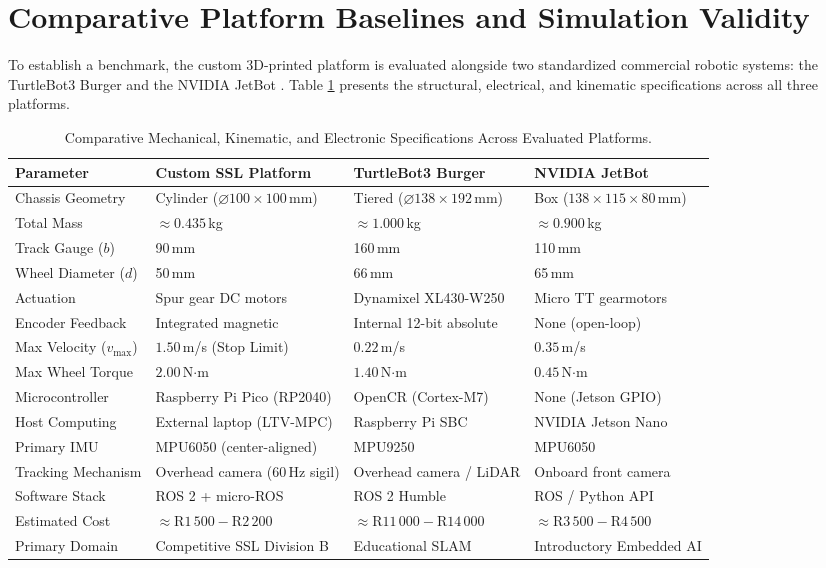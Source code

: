\documentclass[a4paper,twoside,12pt]{report}
\begin{document}
\section{Comparative Platform Baselines and Simulation Validity}

To establish a benchmark, the custom 3D-printed platform is evaluated alongside two standardized commercial robotic systems: the TurtleBot3 Burger \citep{turtlebot3_emanual} and the NVIDIA JetBot \citep{jetbot_org}. Table \ref{tab:platform_comparison} presents the structural, electrical, and kinematic specifications across all three platforms.

\begin{table}[H]
\centering
\small
\caption{Comparative Mechanical, Kinematic, and Electronic Specifications Across Evaluated Platforms.}
\label{tab:platform_comparison}
\begin{tabularx}{\textwidth}{p{3.4cm}XXX}
\toprule
\textbf{Parameter} & \textbf{Custom SSL Platform} & \textbf{TurtleBot3 Burger} & \textbf{NVIDIA JetBot} \\
\midrule
Chassis Geometry & Cylinder ($\varnothing 100 \times 100$\,mm) & Tiered ($\varnothing 138 \times 192$\,mm) & Box ($138 \times 115 \times 80$\,mm) \\
Total Mass & $\approx 0.435$\,kg & $\approx 1.000$\,kg & $\approx 0.900$\,kg \\
Track Gauge ($b$) & 90\,mm & 160\,mm & 110\,mm \\
Wheel Diameter ($d$) & 50\,mm & 66\,mm & 65\,mm \\
Actuation & Spur gear DC motors & Dynamixel XL430-W250 & Micro TT gearmotors \\
Encoder Feedback & Integrated magnetic & Internal 12-bit absolute & None (open-loop) \\
Max Velocity ($v_{\text{max}}$) & $1.50$\,m/s (Stop Limit) & $0.22$\,m/s & $0.35$\,m/s \\
Max Wheel Torque & $2.00$\,N$\cdot$m & $1.40$\,N$\cdot$m & $0.45$\,N$\cdot$m \\
Microcontroller & Raspberry Pi Pico (RP2040) & OpenCR (Cortex-M7) & None (Jetson GPIO) \\
Host Computing & External laptop (LTV-MPC) & Raspberry Pi SBC & NVIDIA Jetson Nano \\
Primary IMU & MPU6050 (center-aligned) & MPU9250 & MPU6050 \\
Tracking Mechanism & Overhead camera (60\,Hz sigil) & Overhead camera / LiDAR & Onboard front camera \\
Software Stack & ROS 2 + micro-ROS & ROS 2 Humble & ROS / Python API \\
Estimated Cost & $\approx \text{R}1\,500 - \text{R}2\,200$ & $\approx \text{R}11\,000 - \text{R}14\,000$ & $\approx \text{R}3\,500 - \text{R}4\,500$ \\
Primary Domain & Competitive SSL Division B & Educational SLAM & Introductory Embedded AI \\
\bottomrule
\end{tabularx}
\end{table}
\end{document}
